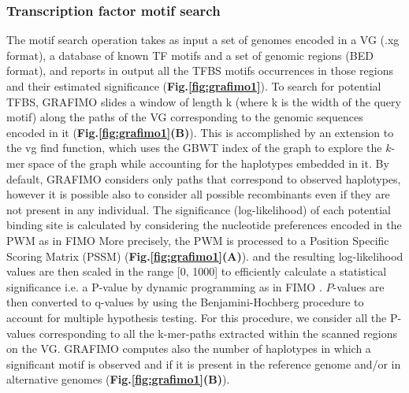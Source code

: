 \documentclass[a4paper, titlepage, openright]{book}
\newcommand{\grafimo}{GRAFIMO\xspace}
\begin{document}
\subsubsection{Transcription factor motif search}
The motif search operation takes as input a set of genomes encoded in a VG (.xg format), a database of known TF motifs and a set of genomic regions (BED format), and reports in output all the TFBS motifs occurrences in those regions and their estimated significance (\textbf{Fig.\ref{fig:grafimo1}}). To search for potential TFBS, GRAFIMO slides a window of length k (where k is the width of the query motif) along the paths of the VG corresponding to the genomic sequences encoded in it (\textbf{Fig.\ref{fig:grafimo1}(B)}). This is accomplished by an extension to the vg find function, which uses the GBWT index of the graph to explore the $k$-mer space of the graph while accounting for the haplotypes embedded in it.  By default, \grafimo considers only paths that correspond to observed haplotypes, however it is possible also to consider all possible recombinants even if they are not present in any individual. The significance (log-likelihood) of each potential binding site is calculated by considering the nucleotide preferences encoded in the PWM as in FIMO More precisely, the PWM is processed to a Position Specific Scoring Matrix (PSSM) (\textbf{Fig.\ref{fig:grafimo1}(A)}). and the resulting log-likelihood values are then scaled in the range [0, 1000] to efficiently calculate a statistical significance i.e. a P-value by dynamic programming as in FIMO \citep{grant2011fimo}.  $P$-values are then converted to q-values by using the Benjamini-Hochberg procedure to account for multiple hypothesis testing. For this procedure, we consider all the P-values corresponding to all the k-mer-paths extracted within the scanned regions on the VG. \grafimo computes also the number of haplotypes in which a significant motif is observed and if it is present in the reference genome and/or in alternative genomes (\textbf{Fig.\ref{fig:grafimo1}(B)}).
\end{document}
